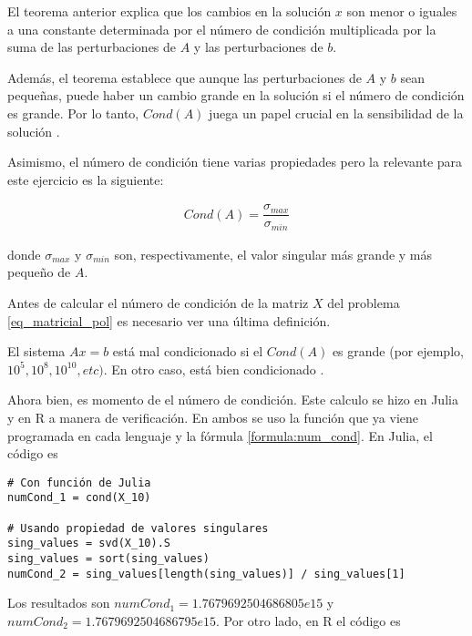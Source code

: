 El teorema anterior explica que los cambios en la solución $x$ son menor o iguales a una constante determinada por el número de condición multiplicada por la suma de las perturbaciones de $A$ y las perturbaciones de $b$. 

Además, el teorema establece que aunque las perturbaciones de $A$ y $b$ sean pequeñas, puede haber un cambio grande en la solución si el número de condición es grande. Por lo tanto, $Cond(A)$ juega un papel crucial en la sensibilidad de la solución \cite{numerical_linear_algebra}. 

Asimismo, el número de condición tiene varias propiedades pero la relevante para este ejercicio es la siguiente:

\begin{equation} \label{formula:num_cond}
    \begin{aligned}
    Cond(A) = \dfrac{\sigma_{max}}{\sigma_{min}}
    \end{aligned}
\end{equation}

donde $\sigma_{max}$ y $\sigma_{min}$ son, respectivamente, el valor singular más grande y más pequeño de $A$. 

Antes de calcular el número de condición de la matriz $X$ del problema \ref{eq_matricial_pol} es necesario ver una última definición. 

\begin{definition} \label{def:condicionamiento}
El sistema $Ax = b$ está mal condicionado si el $Cond(A)$ es grande (por ejemplo, $10^{5}, 10^{8}, 10^{10}, etc)$. En otro caso, está bien condicionado \cite[p.~68]{numerical_linear_algebra}.
\end{definition}

Ahora bien, es momento de el número de condición. Este calculo se hizo en \textsf{Julia} y en \textsf{R} a manera de verificación. En ambos se uso la función que ya viene programada en cada lenguaje y la fórmula \ref{formula:num_cond}. En Julia, el código es 

\begin{verbatim}
# Con función de Julia
numCond_1 = cond(X_10)

# Usando propiedad de valores singulares
sing_values = svd(X_10).S
sing_values = sort(sing_values)
numCond_2 = sing_values[length(sing_values)] / sing_values[1]
\end{verbatim}

Los resultados son $numCond_1 = 1.7679692504686805e15$ y $numCond_2 = 1.7679692504686795e15$. Por otro lado, en R el código es 

